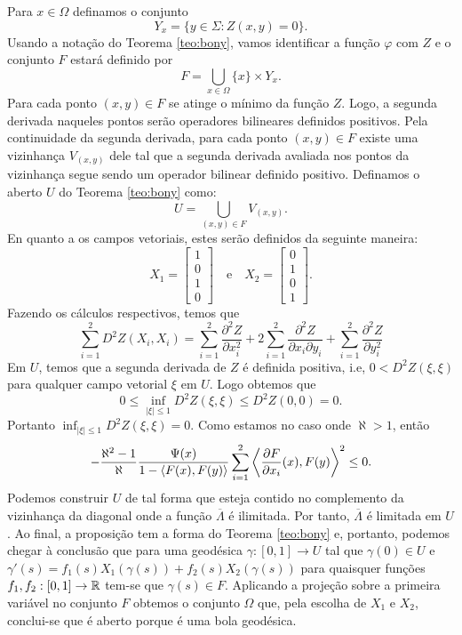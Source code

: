 \begin{demonstracao}
Para $x \in \Omega$	definamos o conjunto
\[ Y_x = \{ y \in \Sigma: Z(x,y)=0 \}. \]
Usando a notação do Teorema \ref{teo:bony}, vamos identificar a função $\varphi$ com $Z$ e o conjunto $F$ estará definido por
\[F = \bigcup_{x \in \Omega} \{x\} \times Y_x.  \]
Para cada ponto $(x,y) \in F$ se atinge o mínimo da função $Z$. Logo, a segunda derivada naqueles pontos serão operadores bilineares definidos positivos. Pela continuidade da segunda derivada, para cada ponto $(x,y) \in F$ existe uma vizinhança $V_{(x,y)}$ dele tal que a segunda derivada avaliada nos pontos da vizinhança segue sendo um operador bilinear definido positivo. 
Definamos o aberto $U$ do Teorema \ref{teo:bony} como:
\[ U = \bigcup_{(x,y) \in F} V_{(x,y)}. \]
En quanto a os campos vetoriais, estes serão definidos da seguinte maneira:
\[ X_1 = \left[ \begin{matrix}
1\\
0\\
1\\
0
\end{matrix} \right] \quad \text{e} \quad X_2 = \left[ \begin{matrix}
0\\
1\\
0\\
1
\end{matrix} \right]. \]
Fazendo os cálculos respectivos, temos que
\[ \sum_{i=1}^{2} D^2 Z (X_i,X_i) = \sum_{i=1}^{2} \frac{\partial^2 Z}{\partial x_i^2} + 2 \sum_{i=1}^{2} \frac{\partial^2 Z}{\partial x_i \partial y_i} + \sum_{i=1}^{2} \frac{\partial^2 Z}{\partial y_i^2} \] 
Em $U$, temos que a segunda derivada de $Z$ é definida positiva, i.e, $0 < D^2 Z(\xi,\xi)$ para qualquer campo vetorial $\xi$ em $U$. Logo obtemos que
\[ 0 \leq \inf_{|\xi| \leq 1} D^2 Z(\xi,\xi) \leq D^2 Z (0,0) = 0. \]
Portanto $\inf_{|\xi| \leq 1} D^2 Z(\xi,\xi) = 0$.
Como estamos no caso onde $\aleph > 1$, então
\[ - \frac{\aleph^2 -1}{\aleph} \frac{\Psi(x)}{1 - \left\langle F(x),F(y) \right\rangle} \sum_{i=1}^{2} \left\langle \frac{\partial F}{\partial x_i}(x),F(y) \right\rangle^2 \leq 0. \]
Podemos construir $U$ de tal forma que esteja contido no complemento da vizinhança da diagonal onde a função $\overline{\Lambda}$ é ilimitada. Por tanto, $\overline{\Lambda}$ é limitada em $U$.
Ao final, a proposição tem a forma do Teorema \ref{teo:bony} e, portanto, podemos chegar à conclusão que para uma geodésica $\gamma: [0,1] \rightarrow U$ tal que $\gamma(0) \in U$ e $\gamma'(s) = f_1(s) X_1(\gamma(s)) + f_2(s) X_2(\gamma(s))$ para quaisquer funções $f_1,f_2: [0,1] \rightarrow \mathbb{R}$ tem-se que $\gamma(s) \in F$.
Aplicando a projeção sobre a primeira variável no conjunto $F$ obtemos o conjunto $\Omega$ que, pela escolha de $X_1$ e $X_2$, conclui-se que é aberto porque é uma bola geodésica. 
\end{demonstracao}


